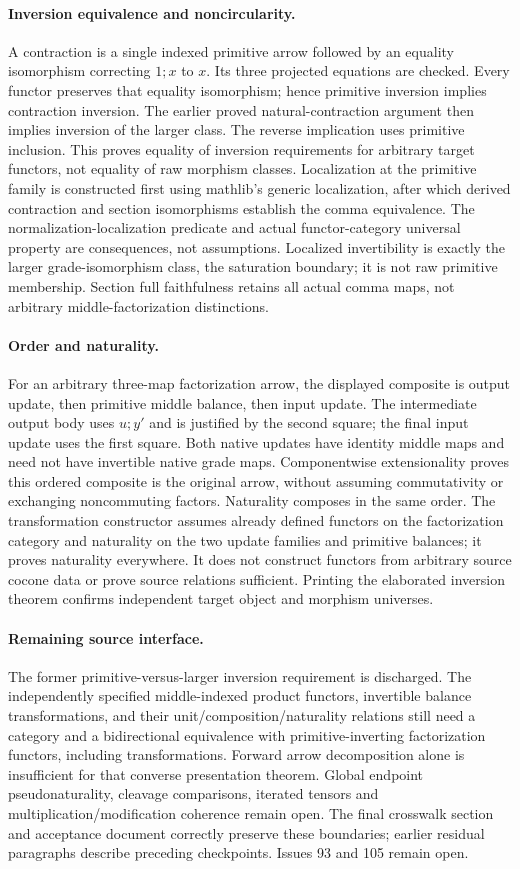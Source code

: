 \documentclass{article}
\begin{document}
\paragraph{Inversion equivalence and noncircularity.} A contraction is a single indexed primitive arrow followed by an equality isomorphism correcting $1;x$ to $x$. Its three projected equations are checked. Every functor preserves that equality isomorphism; hence primitive inversion implies contraction inversion. The earlier proved natural-contraction argument then implies inversion of the larger class. The reverse implication uses primitive inclusion. This proves equality of inversion requirements for arbitrary target functors, not equality of raw morphism classes. Localization at the primitive family is constructed first using mathlib's generic localization, after which derived contraction and section isomorphisms establish the comma equivalence. The normalization-localization predicate and actual functor-category universal property are consequences, not assumptions. Localized invertibility is exactly the larger grade-isomorphism class, the saturation boundary; it is not raw primitive membership. Section full faithfulness retains all actual comma maps, not arbitrary middle-factorization distinctions.
\paragraph{Order and naturality.} For an arbitrary three-map factorization arrow, the displayed composite is output update, then primitive middle balance, then input update. The intermediate output body uses $u;y'$ and is justified by the second square; the final input update uses the first square. Both native updates have identity middle maps and need not have invertible native grade maps. Componentwise extensionality proves this ordered composite is the original arrow, without assuming commutativity or exchanging noncommuting factors. Naturality composes in the same order. The transformation constructor assumes already defined functors on the factorization category and naturality on the two update families and primitive balances; it proves naturality everywhere. It does not construct functors from arbitrary source cocone data or prove source relations sufficient. Printing the elaborated inversion theorem confirms independent target object and morphism universes.
\paragraph{Remaining source interface.} The former primitive-versus-larger inversion requirement is discharged. The independently specified middle-indexed product functors, invertible balance transformations, and their unit/composition/naturality relations still need a category and a bidirectional equivalence with primitive-inverting factorization functors, including transformations. Forward arrow decomposition alone is insufficient for that converse presentation theorem. Global endpoint pseudonaturality, cleavage comparisons, iterated tensors and multiplication/modification coherence remain open. The final crosswalk section and acceptance document correctly preserve these boundaries; earlier residual paragraphs describe preceding checkpoints. Issues 93 and 105 remain open.
\end{document}
